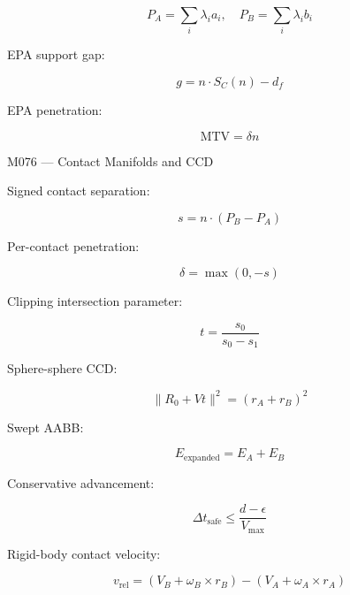 \[
\boxed{P_A=\sum_i\lambda_ia_i,\quad P_B=\sum_i\lambda_ib_i}
\]

EPA support gap:

\[
\boxed{g=n\cdot S_C(n)-d_f}
\]

EPA penetration:

\[
\boxed{\mathrm{MTV}=\delta n}
\]

M076 --- Contact Manifolds and CCD

Signed contact separation:

\[
\boxed{s=n\cdot(P_B-P_A)}
\]

Per-contact penetration:

\[
\boxed{\delta=\max(0,-s)}
\]

Clipping intersection parameter:

\[
\boxed{t=\frac{s_0}{s_0-s_1}}
\]

Sphere-sphere CCD:

\[
\boxed{\|R_0+Vt\|^2=(r_A+r_B)^2}
\]

Swept AABB:

\[
\boxed{E_{\mathrm{expanded}}=E_A+E_B}
\]

Conservative advancement:

\[
\boxed{\Delta t_{\mathrm{safe}}\le\frac{d-\epsilon}{V_{\max}}}
\]

Rigid-body contact velocity:

\[
\boxed{ v_{\mathrm{rel}}= (V_B+\omega_B\times r_B) - (V_A+\omega_A\times r_A) }
\]

